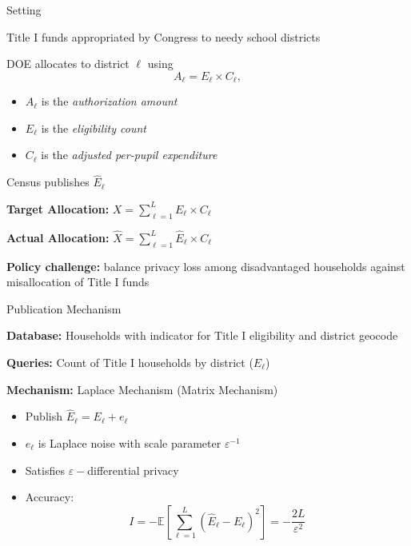 \begin{frame}{Setting}
  \begin{wideitemize}
    \item Title I funds appropriated by Congress to needy school districts
    \item DOE allocates to district $\ell$ using 
$$
	A_{\ell} = E_{\ell}\times C_{\ell},
$$
    \begin{itemize}
    	\item $A_{\ell}$ is the \emph{authorization amount}
    	\item $E_{\ell}$ is the \emph{eligibility count}
    	\item $C_{\ell}$ is the \emph{adjusted per-pupil expenditure}
    \end{itemize}
    \item Census publishes $\widehat{E}_{\ell}$
    \item \textbf{Target Allocation:} $X = \sum_{\ell=1}^{L} E_{\ell}\times C_{\ell}$
    \item \textbf{Actual Allocation:} $\widehat{X} = \sum_{\ell=1}^{L} \widehat{E}_{\ell}\times C_{\ell}$
  \end{wideitemize}
  {\textbf{Policy challenge:} balance privacy loss among disadvantaged households against misallocation of Title I funds}
\end{frame}

\begin{frame}{Publication Mechanism}
  \begin{wideitemize}
  	\item \textbf{Database:} Households with indicator for Title I eligibility and district geocode
  	\item \textbf{Queries:} Count of Title I households by district ($E_{\ell}$)
  	\item \textbf{Mechanism:} Laplace Mechanism (Matrix Mechanism)
  	\begin{itemize}
  		\item Publish $\widehat{E}_{\ell} = E_{\ell}+e_{\ell}$ 
  		\item $e_{\ell}$ is Laplace noise with scale parameter $\varepsilon^{-1}$
  		\item Satisfies $\varepsilon-$differential privacy
  		\item Accuracy:
			$$
				I = -\mathbb{E}\left[\sum_{\ell=1}^{L}\left(\widehat{E}_{\ell}-E_{\ell}\right)^{2}\right] = -\frac{2L}{\varepsilon^{2}}
			$$
  	\end{itemize}
  \end{wideitemize}
\end{frame}

